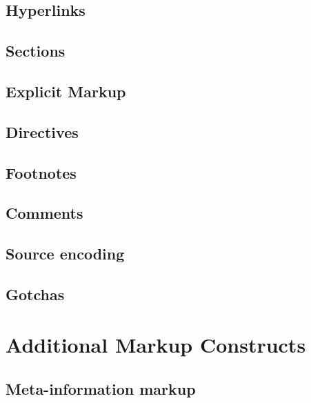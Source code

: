 \documentclass[]{book}
\begin{document}
\hypertarget{hyperlinks}{%
\subsection{Hyperlinks}\label{hyperlinks}}

\hypertarget{sections}{%
\subsection{Sections}\label{sections}}

\hypertarget{explicit-markup}{%
\subsection{Explicit Markup}\label{explicit-markup}}

\hypertarget{directives}{%
\subsection{Directives}\label{directives}}

\hypertarget{footnotes-1}{%
\subsection{Footnotes}\label{footnotes-1}}

\hypertarget{comments}{%
\subsection{Comments}\label{comments}}

\hypertarget{source-encoding}{%
\subsection{Source encoding}\label{source-encoding}}

\hypertarget{gotchas}{%
\subsection{Gotchas}\label{gotchas}}

\hypertarget{additional-markup-constructs}{%
\section{Additional Markup Constructs}\label{additional-markup-constructs}}

\hypertarget{meta-information-markup}{%
\subsection{Meta-information markup}\label{meta-information-markup}}
\end{document}
